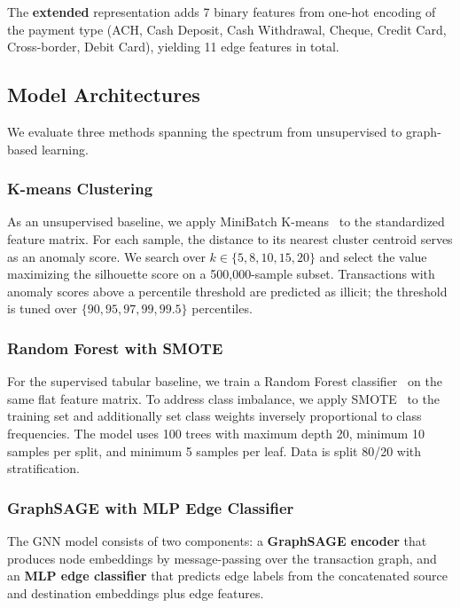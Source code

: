 \documentclass[conference]{IEEEtran}
\begin{document}
The \textbf{extended} representation adds 7 binary features from one-hot encoding of the payment type (ACH, Cash Deposit, Cash Withdrawal, Cheque, Credit Card, Cross-border, Debit Card), yielding 11 edge features in total.

\subsection{Model Architectures}

We evaluate three methods spanning the spectrum from unsupervised to graph-based learning.

\subsubsection{K-means Clustering}

As an unsupervised baseline, we apply MiniBatch K-means~\cite{sculley2010kmeans} to the standardized feature matrix. For each sample, the distance to its nearest cluster centroid serves as an anomaly score. We search over $k \in \{5, 8, 10, 15, 20\}$ and select the value maximizing the silhouette score on a 500{,}000-sample subset. Transactions with anomaly scores above a percentile threshold are predicted as illicit; the threshold is tuned over $\{90, 95, 97, 99, 99.5\}$ percentiles.

\subsubsection{Random Forest with SMOTE}

For the supervised tabular baseline, we train a Random Forest classifier~\cite{breiman2001random} on the same flat feature matrix. To address class imbalance, we apply SMOTE~\cite{chawla2002smote} to the training set and additionally set class weights inversely proportional to class frequencies. The model uses 100 trees with maximum depth 20, minimum 10 samples per split, and minimum 5 samples per leaf. Data is split 80/20 with stratification.

\subsubsection{GraphSAGE with MLP Edge Classifier}

The GNN model consists of two components: a \textbf{GraphSAGE encoder} that produces node embeddings by message-passing over the transaction graph, and an \textbf{MLP edge classifier} that predicts edge labels from the concatenated source and destination embeddings plus edge features.
\end{document}
